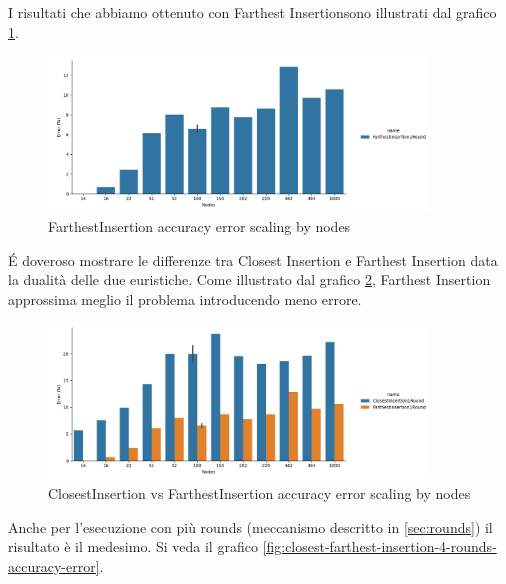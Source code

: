 \noindent I risultati che abbiamo ottenuto con Farthest Insertionsono
illustrati dal grafico \ref{fig:farthest-insertion-accuracy-error}.\\

\begin{figure}[H]
    \centering

    \includegraphics[width=0.9\textwidth]{./images/FarthestInsertion1Round__approximation_error_.png}

    \caption{FarthestInsertion accuracy error scaling by nodes}
    \label{fig:farthest-insertion-accuracy-error}
\end{figure}

\noindent \'E doveroso mostrare le differenze tra Closest Insertion e
Farthest Insertion data la dualità delle due euristiche. Come
illustrato dal grafico
\ref{fig:closest-farthest-insertion-accuracy-error}, Farthest
Insertion approssima meglio il problema introducendo meno errore.\\

\begin{figure}[H]
    \centering

    \includegraphics[width=0.9\textwidth]{./images/ClosestInsertion1Round_vs_FarthestInsertion1Round__approximation_error_.png}

    \caption{ClosestInsertion vs FarthestInsertion accuracy error scaling by nodes}
    \label{fig:closest-farthest-insertion-accuracy-error}
\end{figure}

\noindent Anche per l'esecuzione con più rounds (meccanismo descritto
in \ref{sec:rounds}) il risultato è il medesimo. Si veda il grafico
\ref{fig:closest-farthest-insertion-4-rounds-accuracy-error}.\\

